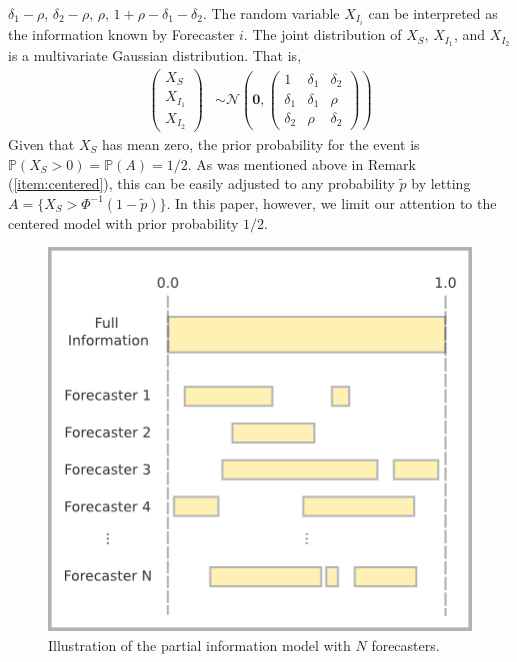 \documentclass[11pt]{article}
\renewcommand{\P}{\mathbb{P}}
\theoremstyle{definition}
\theoremstyle{definition}
\def\P{{\mathbb P}}
\begin{document}
$\delta_1-\rho$, $\delta_2-\rho$, $\rho$, $1+\rho-\delta_1 - \delta_2$. 
The random variable $X_{I_i}$ can be interpreted as the information 
known by Forecaster $i$.  The joint distribution of $X_{S}$, $X_{I_1}$, 
and $X_{I_2}$ is a multivariate Gaussian distribution.  That is,
\begin{align}
\left(\begin{matrix} X_S \\ X_{I_1}\\ X_{I_2} \end{matrix}\right) 
 &\sim \mathcal{N}\left(
 \boldsymbol{0},  \left(\begin{matrix} 
1 & \delta_1 & \delta_2\\
\delta_1 & \delta_1 &\rho\\
\delta_2 & \rho & \delta_2
 \end{matrix}\right)\right) \label{twoforecasters}
\end{align}
Given that $X_S$ has mean zero, the prior probability for the event 
is $\P(X_S > 0) = \P(A) = 1/2$.  As was mentioned above in Remark (\ref{item:centered}), 
this can be easily adjusted to any probability $\tilde{p}$ by 
letting $A = \{ X_S > \Phi^{-1}(1-\tilde{p}) \}$.  In this paper, however,
we limit our attention to the centered model with prior probability $1/2$.

\begin{figure}[htbp]
   \includegraphics[width = \textwidth]{N=N} %
   \caption{Illustration of the partial information model with $N$ forecasters.}
   \label{diagramN}
\end{figure}
\end{document}
